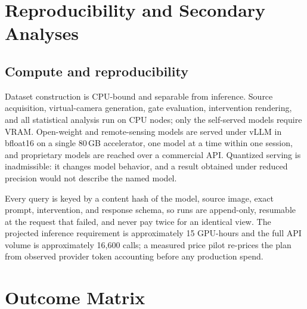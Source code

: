 \section{Reproducibility and Secondary Analyses}

\subsection{Compute and reproducibility}
Dataset construction is CPU-bound and separable from inference. Source
acquisition, virtual-camera generation, gate evaluation, intervention rendering,
and all statistical analysis run on CPU nodes; only the self-served models
require VRAM. Open-weight and remote-sensing models are served under vLLM in
bfloat16 on a single 80\,GB accelerator, one model at a time within one session,
and proprietary models are reached over a commercial API. Quantized serving is
inadmissible: it changes model behavior, and a result obtained under reduced
precision would not describe the named model.

Every query is keyed by a content hash of the model, source image, exact prompt,
intervention, and response schema, so runs are append-only, resumable at the
request that failed, and never pay twice for an identical view. The projected
inference requirement is approximately 15 GPU-hours and the full API volume is
approximately 16{,}600 calls; a measured price pilot re-prices the plan from
observed provider token accounting before any production spend. 

\section{Outcome Matrix}

